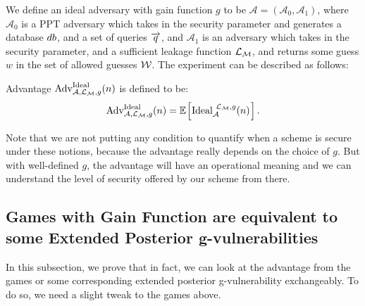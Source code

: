 \begin{definition}
We define an ideal adversary with gain function $g$ to be $\mathcal{A} = (\mathcal{A}_0, \mathcal{A}_1)$, where $\mathcal{A}_0$ is a PPT adversary which takes in the security parameter and generates a database $db$, and a set of queries $\overrightarrow{q}$, and $\mathcal{A}_1$ is an adversary which takes in the security parameter, and a sufficient leakage function $\mathcal{L}_\mathcal{M}$, and returns some guess $w$ in the set of allowed guesses $\mathcal{W}$. The experiment can be described as follows:
\begin{pchstack}[center]
\end{pchstack}
	
Advantage $\text{Adv}_{\mathcal{A}, \mathcal{L}_\mathcal{M}, g}^{\text{Ideal}}(n)$ is defined to be:
\begin{equation}
	\advantage_{\mathcal{A}, \leakm, g}^{\text{Ideal}}(n) = \expect{\text{Ideal}_{\adv}^{\ \leakm, g}(n)}.
\end{equation}
\end{definition}

Note that we are not putting any condition to quantify when a scheme is secure under these notions, because the advantage really depends on the choice of $g$. But with well-defined $g$, the advantage will have an operational meaning and we can understand the level of security offered by our scheme from there.




\subsection{Games with Gain Function are equivalent to some Extended Posterior g-vulnerabilities}
In this subsection, we prove that in fact, we can look at the advantage from the games or some corresponding extended posterior g-vulnerability exchangeably. To do so, we need a slight tweak to the games above.

